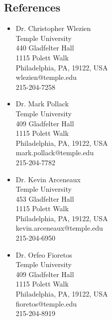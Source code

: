 \documentclass[margin, 12pt]{res} %
\begin{document}
\begin{resume}
\section{References}

\begin{minipage}[ht]{0.5\textwidth}

\begin{itemize}
\item Dr. Christopher Wlezien \\
Temple University \\
440 Gladfelter Hall \\
1115 Polett Walk \\
Philadelphia, PA, 19122, USA \\
wlezien@temple.edu \\
215-204-7258 \\
\end{itemize}

\begin{itemize}
\item Dr. Mark Pollack \\
Temple University \\
409 Gladfelter Hall \\
1115 Polett Walk \\
Philadelphia, PA, 19122, USA \\
mark.pollack@temple.edu \\
215-204-7782 \\
\end{itemize}

\begin{itemize}
\item Dr. Kevin Arceneaux \\
Temple University \\
453 Gladfelter Hall \\
1115 Polett Walk \\
Philadelphia, PA, 19122, USA \\
kevin.arceneaux@temple.edu \\
215-204-6950 \\
\end{itemize}

\end{minipage}
\begin{minipage}[ht]{0.5\textwidth}
\begin{itemize}
\item Dr. Orfeo Fioretos \\
Temple University \\
409 Gladfelter Hall \\
1115 Polett Walk \\
Philadelphia, PA, 19122, USA \\
fioretos@temple.edu \\
215-204-8919 \\
\end{itemize}


\end{minipage}
\end{resume}
\end{document}
